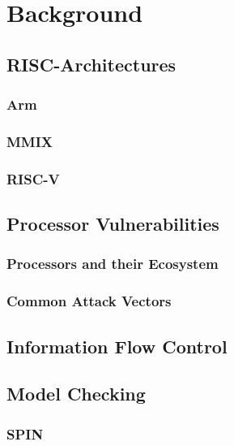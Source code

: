 
\section{Background}

\subsection{RISC-Architectures}

\subsubsection{Arm}

\subsubsection{MMIX}

\subsubsection{RISC-V}

\subsection{Processor Vulnerabilities}

\subsubsection{Processors and their Ecosystem}

\subsubsection{Common Attack Vectors}

\subsection{Information Flow Control}

\subsection{Model Checking}

\subsubsection{SPIN}

